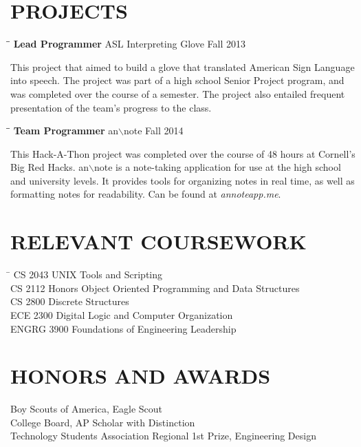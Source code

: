 \documentclass{res}
\begin{document}
\begin{resume}
    
\section{PROJECTS}    
	\vspace{-0.1in}
	\begin{tabbing}
   \hspace{2.3in}\= \hspace{2.4in}\= \kill
    {\bf Lead Programmer} \>ASL Interpreting Glove \>Fall 2013\\
   \end{tabbing}\vspace{-30pt}
    This project that aimed to build a glove that translated American
    Sign Language into speech. The project was part of a high school Senior Project
    program, and was completed over the course of a semester. The project also entailed
    frequent presentation of the team's progress to the class.
    \begin{tabbing}
   \hspace{2.3in}\= \hspace{2.4in}\= \kill
    {\bf Team Programmer} \>an$\backslash$note \>Fall 2014\\
   \end{tabbing}\vspace{-30pt}
    This Hack-A-Thon project was completed over the course of 48 hours at Cornell's
    Big Red Hacks. an$\backslash$note is a note-taking application for use at the high
    school and university levels. It provides tools for organizing notes in real time,
    as well as formatting notes for readability. Can be found 
    at \textit{annoteapp.me}.
    
    
\section{RELEVANT COURSEWORK}
\vspace{-0.1in}
\begin{tabbing}
\hspace{2.3in} \= \kill
CS 2043 \>UNIX Tools and Scripting \\
CS 2112 \>Honors Object Oriented Programming and Data Structures \\
CS 2800 \>Discrete Structures \\
ECE 2300 \>Digital Logic and Computer Organization \\
ENGRG 3900 \>Foundations of Engineering Leadership
\end{tabbing}
 
\section{HONORS AND AWARDS}
	Boy Scouts of America, Eagle Scout \\
	College Board, AP Scholar with Distinction \\
	Technology Students Association Regional 1st Prize, Engineering Design
	
\end{resume}
\end{document}
